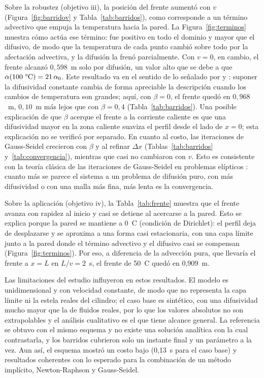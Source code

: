 \documentclass[final,5p,times,twocolumn,authoryear,11pt]{elsarticle}
\begin{document}
Sobre la robustez (objetivo iii), la posición del frente aumentó con $v$ (Figura~\ref{fig:barridov} y Tabla~\ref{tab:barridos}), como corresponde a un término advectivo que empuja la temperatura hacia la pared. La Figura~\ref{fig:terminos} muestra cómo actúa ese término: fue positivo en todo el dominio y mayor que el difusivo, de modo que la temperatura de cada punto cambió sobre todo por la afectación advectiva, y la difusión la frenó parcialmente. Con $v=0$, en cambio, el frente alcanzó $0{,}598$~m solo por difusión, un valor alto que se debe a que $\alpha(100~\text{\textdegree C})=21\,\alpha_0$. Este resultado va en el sentido de lo señalado por \citet{Wang2022} y \citet{Filipov2023}: suponer la difusividad constante cambia de forma apreciable la descripción cuando los cambios de temperatura son grandes; aquí, con $\beta=0$, el frente quedó en $0{,}968$~m, $0{,}10$~m más lejos que con $\beta=0{,}4$ (Tabla~\ref{tab:barridos}). Una posible explicación de que $\beta$ acerque el frente a la corriente caliente es que una difusividad mayor en la zona caliente suaviza el perfil desde el lado de $x=0$; esta explicación no se verificó por separado. En cuanto al costo, las iteraciones de Gauss-Seidel crecieron con $\beta$ y al refinar $\Delta x$ (Tablas~\ref{tab:barridos} y~\ref{tab:convergencia}), mientras que casi no cambiaron con $v$. Esto es consistente con la teoría clásica de las iteraciones de Gauss-Seidel en problemas elípticos \citep{Young1954}: cuanto más se parece el sistema a un problema de difusión puro, con más difusividad o con una malla más fina, más lenta es la convergencia.

Sobre la aplicación (objetivo iv), la Tabla~\ref{tab:frente} muestra que el frente avanza con rapidez al inicio y casi se detiene al acercarse a la pared. Esto se explica porque la pared se mantiene a 0~\textdegree C (condición de Dirichlet): el perfil deja de desplazarse y se aproxima a una forma casi estacionaria, con una capa límite junto a la pared donde el término advectivo y el difusivo casi se compensan (Figura~\ref{fig:terminos}). Por eso, a diferencia de la advección pura, que llevaría el frente a $x=L$ en $L/v=2$~s, el frente de 50~\textdegree C quedó en 0,909~m.

Las limitaciones del estudio influyeron en estos resultados. El modelo es unidimensional y con velocidad constante, de modo que no representa la capa límite ni la estela reales del cilindro; el caso base es sintético, con una difusividad mucho mayor que la de fluidos reales, por lo que los valores absolutos no son extrapolables y el análisis cualitativo es el que tiene alcance general. La referencia se obtuvo con el mismo esquema y no existe una solución analítica con la cual contrastarla, y los barridos cubrieron solo un instante final y un parámetro a la vez. Aun así, el esquema mostró un costo bajo (0,13~s para el caso base) y resultados coherentes con lo esperado para la combinación de un método implícito, Newton-Raphson y Gauss-Seidel.
\end{document}
